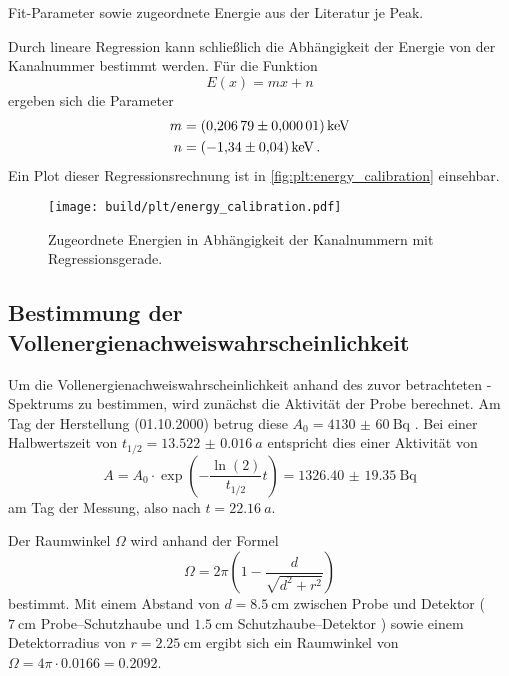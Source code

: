 \begin{table}
    \centering
    \caption{Fit-Parameter sowie zugeordnete Energie aus der Literatur \cite{lara} je Peak.}
    \label{tab:1_energiekalibrierung}
\end{table}

Durch lineare Regression kann schließlich die Abhängigkeit der Energie von der Kanalnummer bestimmt werden.
Für die Funktion
\begin{equation*}
    E(x) = m x + n
\end{equation*}
ergeben sich die Parameter
\begin{align*}
    m &= \SI{0.20679 \pm 0.00001}{\kilo\electronvolt} \\
    n &= \SI{-1.34 \pm 0.04}{\kilo\electronvolt} \, .
\end{align*}
Ein Plot dieser Regressionsrechnung ist in \autoref{fig:plt:energy_calibration} einsehbar.

\begin{figure}
    \centering
    \texttt{[image: build/plt/energy\_calibration.pdf]}
    \caption{Zugeordnete Energien in Abhängigkeit der Kanalnummern mit Regressionsgerade.}
    \label{fig:plt:energy_calibration}
\end{figure}


\FloatBarrier %
\subsection{Bestimmung der Vollenergienachweiswahrscheinlichkeit} \label{sec:auswertung:effizienz}
Um die Vollenergienachweiswahrscheinlichkeit anhand des zuvor betrachteten -Spektrums zu bestimmen,
wird zunächst die Aktivität der Probe berechnet.
Am Tag der Herstellung (01.10.2000) betrug diese $A_0 = \SI{4130(60)}{\becquerel}$ \cite{versuchsanleitung}.
Bei einer Halbwertszeit von $t_{1/2} = \SI{13.522(16)}{a}$ \cite{lara} entspricht dies einer Aktivität von
\begin{equation*}
    A = A_0 \cdot \exp\left(-\frac{\ln(2)}{t_{1/2}} t\right)
    = \SI{1326.40(1935)}{\becquerel}
\end{equation*}
am Tag der Messung,
also nach $t = \SI{22.16}{a}$.

Der Raumwinkel $\Omega$ wird anhand der Formel
\begin{equation*}
    \Omega = 2\pi \left( 1 - \frac{d}{\sqrt{d^2 + r^2}} \right)
\end{equation*}
bestimmt.
Mit
    einem Abstand von $d = \SI{8.5}{\centi\meter}$ zwischen Probe und Detektor
        (
            $\SI{7}{\centi\meter}$ Probe–Schutzhaube
            und
            $\SI{1.5}{\centi\meter}$ Schutzhaube–Detektor
        )
    sowie einem Detektorradius von $r = \SI{2.25}{\centi\meter}$
ergibt sich ein Raumwinkel von
$\Omega = 4\pi \cdot \num{0.0166} = \num{0.2092}$.

